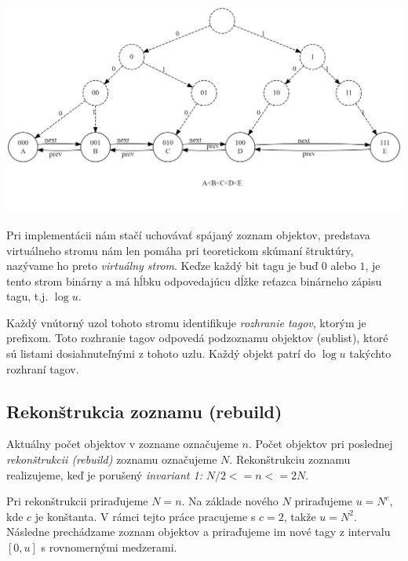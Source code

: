 \documentclass[
  digital,     %
  oneside,     %
  nosansbold,  %
  nocolorbold, %
  lof,         %
  lot,         %
]{fithesis4}
\begin{document}
\includegraphics[width=\textwidth]{graphics/graphviz.png}

Pri implementácii nám stačí uchovávať spájaný zoznam objektov, predstava virtuálneho stromu nám len pomáha pri teoretickom skúmaní štruktúry, nazývame ho preto \textit{virtuálny strom}. Keďze každý bit tagu je buď $0$ alebo $1$, je tento strom binárny a má hĺbku odpovedajúcu dĺžke reťazca binárneho zápisu tagu, t.j. $\log{u}$.

Každý vnútorný uzol tohoto stromu identifikuje \textit{rozhranie tagov}, ktorým je prefixom. Toto rozhranie tagov odpovedá podzoznamu objektov (sublist), ktoré sú listami dosiahnuteľnými z tohoto uzlu. Každý objekt patrí do $\log{u}$ takýchto rozhraní tagov.

\subsection{Rekonštrukcia zoznamu (rebuild)}

Aktuálny počet objektov v zozname označujeme $n$. Počet objektov pri poslednej \textit{rekonštrukcii (rebuild)} zoznamu označujeme $N$. Rekonštrukciu zoznamu realizujeme, keď je porušený \textit{invariant 1:} $N/2 <= n <= 2N$.

Pri rekonštrukcii priraďujeme $N = n$. Na základe nového $N$ priraďujeme $u = N^c$, kde $c$ je konštanta. V rámci tejto práce pracujeme s $c = 2$, takže $u = N^2$. Následne prechádzame zoznam objektov a priraďujeme im nové tagy z intervalu $[0, u]$ s rovnomernými medzerami.
\end{document}
